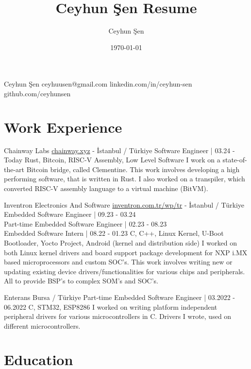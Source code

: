 \documentclass[10pt]{brutalist}
\title{Ceyhun Şen Resume}
\author{Ceyhun Şen}
\date{\today}
\begin{document}
\contactbox
{Ceyhun Şen}
{ceyhuusen@gmail.com}
{linkedin.com/in/ceyhun-sen}
{github.com/ceyhunsen}

\section*{Work Experience}

\experiencebox
{Chainway Labs}
{
	\href{https://chainway.xyz/}{chainway.xyz} - %
	İstanbul / Türkiye
}
{
	Software Engineer | 03.24 - Today
}
{Rust, Bitcoin, RISC-V Assembly, Low Level Software}
{I work on a state-of-the-art Bitcoin bridge, called Clementine. This work involves developing a high performing software, that is written in Rust. I also worked on a transpiler, which converted RISC-V assembly language to a virtual machine (BitVM).}

\experiencebox
{Inventron Electronics And Software}
{
	\href{https://inventron.com.tr/wp/tr}{inventron.com.tr/wp/tr} - %
	İstanbul / Türkiye
}
{
	Embedded Software Engineer | 09.23 - 03.24\\%
	Part-time Embedded Software Engineer | 02.23 - 08.23\\%
	Embedded Software Intern | 08.22 - 01.23
}
{C, C++, Linux Kernel, U-Boot Bootloader, Yocto Project, Android (kernel and distribution side)}
{I worked on both Linux kernel drivers and board support package development for NXP i.MX based microprocessors and custom SOC's. This work involves writing new or updating existing device drivers/functionalities for various chips and peripherals. All to provide BSP's to complex SOM's and SOC's.}

\experiencebox
{Enterans}
{Bursa / Türkiye}
{
	Part-time Embedded Software Engineer | 03.2022 - 06.2022
}
{C, STM32, ESP8286}
{I worked on writing platform independent peripheral drivers for various microcontrollers in C. Drivers I wrote, used on different microcontrollers.}

\section*{Education}
\end{document}
